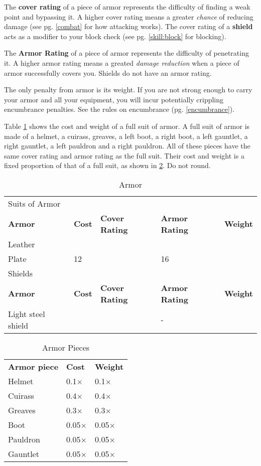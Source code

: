The \textbf{cover rating} of a piece of armor represents the difficulty of
finding a weak point and bypassing it. A higher cover rating means a greater \textit{chance}
of reducing damage (see pg. \ref{combat} for how attacking works). The cover
rating of a \textbf{shield} acts as a modifier to your block check (see pg.
\ref{skill:block} for blocking).

The \textbf{Armor Rating} of a piece of armor represents the difficulty of
penetrating it. A higher armor rating means a greated \textit{damage reduction}
when a piece of armor successfully covers you. Shields do not have an armor
rating.

The only penalty from armor is its weight. If you are not strong enough to
carry your armor and all your equipment, you will incur potentially
crippling encumbrance penalties. See the rules on encumbrance (pg.
\ref{encumbrance}).

Table \ref{tab:armor} shows the cost and weight of a full suit of armor. A full
suit of armor is made of a helmet, a cuirass, greaves, a left boot, a right
boot, a left gauntlet, a right gauntlet, a left pauldron and a right pauldron.
All of these pieces have the same cover rating and armor rating as the full
suit. Their cost and weight is a fixed proportion of that of a full suit, as
shown in \ref{tab:armor-pieces}. Do not round.

\begin{table}[h!]
    \begin{tabular}{l l l l l}
        \multicolumn{5}{l}{Suits of Armor} \\
        \bfseries{Armor} & \bfseries{Cost} & \bfseries{Cover Rating} & \bfseries{Armor Rating} & \bfseries{Weight} \\
        Leather & & & & \\
        Plate & 12 & & 16 & \\
        \multicolumn{5}{l}{Shields} \\
        \bfseries{Armor} & \bfseries{Cost} & \bfseries{Cover Rating} & \bfseries{Armor Rating} & \bfseries{Weight} \\
        Light steel shield & & & - & \\
    \end{tabular}
    \caption{Armor}
    \label{tab:armor}
\end{table}

\begin{table}[h!]
    \begin{tabular}{l l l}
        \bfseries{Armor piece} & \bfseries{Cost} & \bfseries{Weight} \\
        Helmet & 0.1$\times$ & 0.1$\times$ \\
        Cuirass & 0.4$\times$ & 0.4$\times$ \\
        Greaves & 0.3$\times$ & 0.3$\times$ \\
        Boot & 0.05$\times$ & 0.05$\times$ \\
        Pauldron & 0.05$\times$ & 0.05$\times$ \\
        Gauntlet & 0.05$\times$ & 0.05$\times$ \\
    \end{tabular}
    \caption{Armor Pieces}
    \label{tab:armor-pieces}
\end{table}
